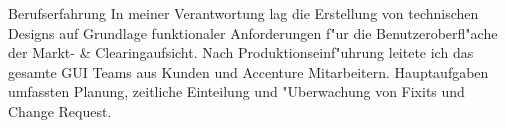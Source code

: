 \begin{rubric}{Berufserfahrung}
In meiner Verantwortung lag die Erstellung von technischen Designs auf Grundlage funktionaler Anforderungen f"ur die Benutzeroberfl"ache der Markt- \& Clearingaufsicht. Nach Produktionseinf"uhrung leitete ich das gesamte GUI Teams aus Kunden und Accenture Mitarbeitern. Hauptaufgaben umfassten Planung, zeitliche Einteilung und "Uberwachung von Fixits und Change Request. \newline




\end{rubric}
